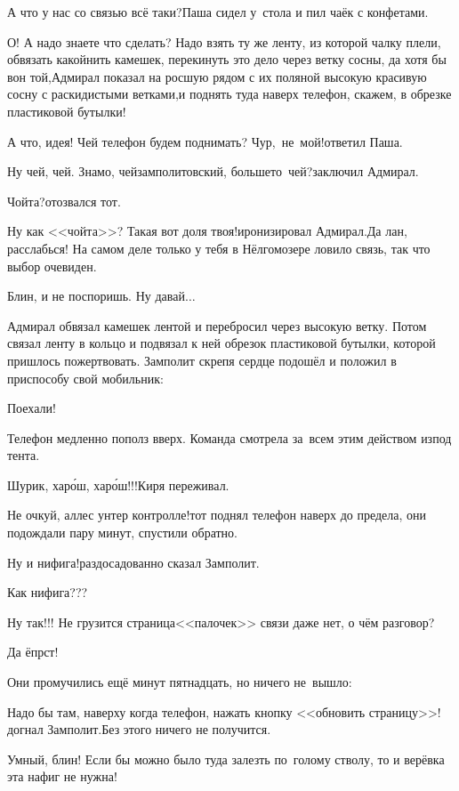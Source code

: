 \diagdash А что у нас со связью всё таки?\mdash Паша сидел у~стола и пил чаёк с конфетами.

\diagdash О! А надо знаете что сделать? Надо взять ту же ленту, из которой чалку плели, обвязать какой\sdash нить камешек, перекинуть это дело через ветку сосны, да хотя бы вон той,\mdash Адмирал показал на росшую рядом с их поляной высокую красивую сосну с раскидистыми ветками,\mdash и поднять туда наверх телефон, скажем, в обрезке пластиковой бутылки!

\diagdash А что, идея! Чей телефон будем поднимать? Чур,~не~мой!\mdash ответил Паша.

\diagdash Ну чей, чей. Знамо, чей\mdash замполитовский, больше\sdash то~чей?\mdash заключил Адмирал.

\diagdash Чойта?\mdash отозвался тот.

\diagdash Ну как <<чойта>>? Такая вот доля твоя!\mdash иронизировал Адмирал.\mdash Да лан, расслабься! На самом деле только у тебя в Нёлгомозере ловило связь, так что выбор очевиден.

\diagdash Блин, и не поспоришь. Ну давай$\ldots$

Адмирал обвязал камешек лентой и перебросил через высокую ветку. Потом связал ленту в кольцо и подвязал к ней обрезок пластиковой бутылки, которой пришлось пожертвовать. Замполит скрепя сердце подошёл и положил в приспособу свой мобильник:

\diagdash Поехали!

Телефон медленно пополз вверх. Команда смотрела за~всем этим действом из\sdash под тента.

\diagdash Шурик, хар{\'о}ш, хар{\'о}ш!!!\mdash Киря переживал.

\diagdash Не очкуй, аллес унтер контролле!\mdash тот поднял телефон наверх до предела, они подождали пару минут, спустили обратно.

\diagdash Ну и нифига!\mdash раздосадованно сказал Замполит.

\diagdash Как нифига???

\diagdash Ну так!!! Не грузится страница\mdash <<палочек>> связи даже нет, о чём разговор?

\diagdash Да ёпрст!

Они промучились ещё минут пятнадцать, но ничего не~вышло:

\diagdash Надо бы там, наверху когда телефон, нажать кнопку <<обновить страницу>>!\mdash догнал Замполит.\mdash Без этого ничего не получится.

\diagdash Умный, блин! Если бы можно было туда залезть по~голому стволу, то и верёвка эта нафиг не нужна!

